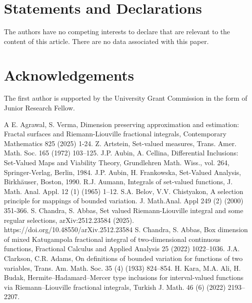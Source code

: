 \documentclass{amsproc}
\theoremstyle{definition}
\theoremstyle{remark}
\numberwithin{equation}{section}
\begin{document}
\section*{Statements and Declarations}
 The authors have no competing interests to declare that are relevant to the content of this article. There are no data associated with this paper. 
   
\section*{Acknowledgements}
 The first author is supported by the University Grant Commission in the form of Junior Research Fellow. 
 


\begin{thebibliography}{A}
 E. Agrawal, S. Verma, Dimension preserving approximation and estimation: Fractal surfaces and Riemann-Liouville fractional integrals,  Contemporary Mathematics 825 (2025) 1-24.
 Z. Artstein, Set-valued measures, Trans. Amer. Math. Soc. 165 (1972) 103–125.
 J.P. Aubin, A. Cellina, Differential Inclusions: Set-Valued Maps and Viability Theory, Grundlehren Math. Wiss., vol. 264, Springer-Verlag, Berlin, 1984.
 J.P. Aubin, H. Frankowska, Set-Valued Analysis, Birkhäuser, Boston, 1990.
 R.J. Aumann, Integrals of set-valued functions, J. Math. Anal. Appl. 12 (1) (1965) 1–12.
 S.A. Belov, V.V. Chistyakon, A selection principle for mappings of bounded variation. J. Math.Anal. Appl 249 (2)  (2000) 351-366.
 S. Chandra, S. Abbas, Set valued Riemann-Liouville integral and some regular selections, arXiv:2512.23584 (2025). https://doi.org/10.48550/arXiv.2512.23584
 S. Chandra, S. Abbas, Box dimension of mixed Katugampola fractional integral of two-dimensional continuous functions, Fractional Calculus and Applied Analysis 25 (2022) 1022–1036.
  J.A. Clarkson, C.R. Adams, On definitions of bounded variation for functions of two variables, Trans.
Am. Math. Soc. 35 (4) (1933)  824–854.
 H. Kara, M.A. Ali, H. Budak, Hermite–Hadamard–Mercer type inclusions for interval-valued functions via Riemann–Liouville fractional integrals, Turkish J. Math. 46 (6) (2022) 2193–2207.

\end{thebibliography}
\end{document}
